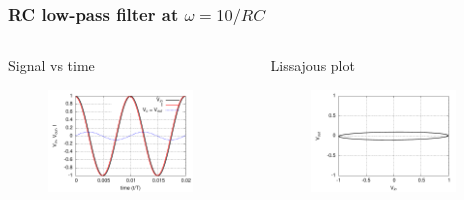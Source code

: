 \documentclass[beamer]{standalone}
\begin{document}
\begin{frame}
\frametitle{RC low-pass filter at $\omega=10/RC$}
\begin{columns}[c]
 \begin{column}{.55\textwidth}
  Signal vs time
  \begin{figure}
   \includegraphics[angle=0,width=0.90\textwidth]{./plots/i_v_vr_w=10rc}
  \end{figure}
 \end{column}
 \begin{column}{.45\textwidth}
  Lissajous plot
  \begin{figure}
   \includegraphics[angle=0,width=0.90\textwidth]{./plots/vc_vs_vin_w=10rc}
  \end{figure}
 \end{column}
\end{columns}
\end{frame}
\end{document}
